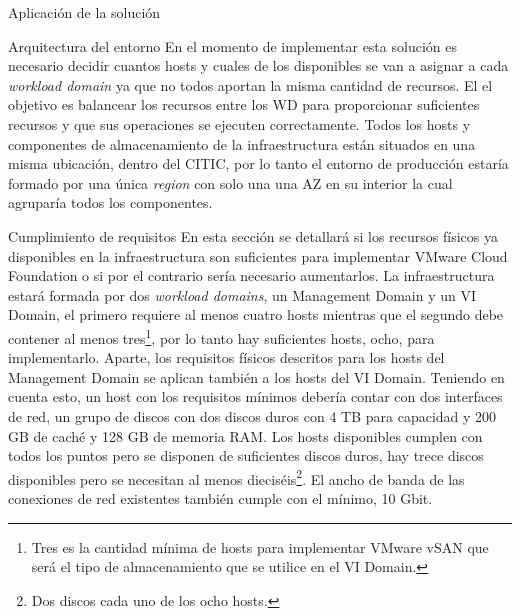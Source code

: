 \begin{chapter}{Aplicación de la solución}
\begin{section}{Arquitectura del entorno}
En el momento de implementar esta solución es necesario decidir cuantos hosts y cuales de los disponibles se van a asignar a cada \textit{workload domain} ya que no todos aportan la misma cantidad de recursos. El el objetivo es balancear los recursos entre los WD para proporcionar suficientes recursos y que sus operaciones se ejecuten correctamente.
Todos los hosts y componentes de almacenamiento de la infraestructura están situados en una misma ubicación, dentro del CITIC, por lo tanto el entorno de producción estaría formado por una única \textit{region} con solo una una AZ en su interior la cual agruparía todos los componentes.
\end{section}

\begin{section}{Cumplimiento de requisitos}
    En esta sección se detallará si los recursos físicos ya disponibles en la infraestructura son suficientes para implementar VMware Cloud Foundation o si por el contrario sería necesario aumentarlos.
    La infraestructura estará formada por dos \textit{workload domains}, un Management Domain y un VI Domain, el primero requiere al menos cuatro hosts mientras que el segundo debe contener al menos tres\footnote{Tres es la cantidad mínima de hosts para implementar VMware vSAN que será el tipo de almacenamiento que se utilice en el VI Domain.}, por lo tanto hay suficientes hosts, ocho, para implementarlo. Aparte, los requisitos físicos descritos para los hosts del Management Domain se aplican también a los hosts del VI Domain. Teniendo en cuenta esto, un host con los requisitos mínimos debería contar con dos interfaces de red, un grupo de discos con dos discos duros con 4 TB para capacidad y 200 GB de caché y 128 GB de memoria RAM. Los hosts disponibles cumplen con todos los puntos pero se disponen de suficientes discos duros, hay trece discos disponibles pero se necesitan al menos dieciséis\footnote{Dos discos cada uno de los ocho hosts.}. El ancho de banda de las conexiones de red existentes también cumple con el mínimo, 10 Gbit.

    \end{section}


\end{chapter}
